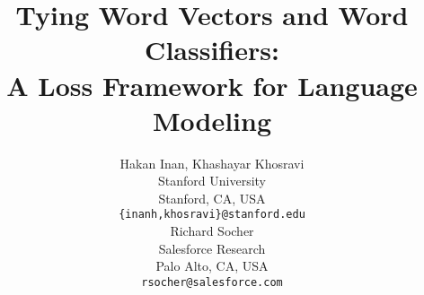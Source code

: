 \documentclass{article}
\begin{document}
\title{Tying Word Vectors and Word Classifiers:\\A Loss Framework for Language Modeling}

\author{Hakan Inan,\hspace{1mm} Khashayar Khosravi \\
Stanford University \\ Stanford, CA, USA\\
\texttt{\{inanh,khosravi\}@stanford.edu} \\
\And
Richard Socher \\
Salesforce Research \\ Palo Alto, CA, USA \\
\texttt{rsocher@salesforce.com}
}


\maketitle

\begin{abstract}

\end{abstract}













\newpage



\newpage

\end{document}
